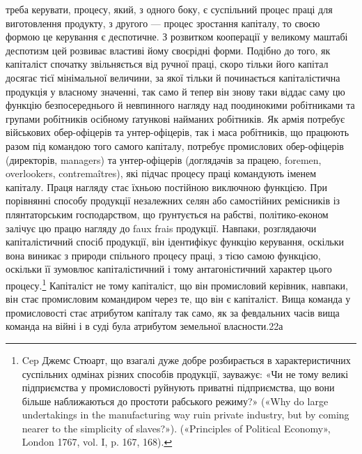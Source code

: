 \parcont{}  %
треба керувати, процесу, який, з одного боку, є суспільний процес
праці для виготовлення продукту, з другого — процес зростання
капіталу, то своєю формою це керування є деспотичне. З розвитком
кооперації у великому маштабі деспотизм цей розвиває властиві
йому своєрідні форми. Подібно до того, як капіталіст спочатку
звільняється від ручної праці, скоро тільки його капітал
досягає тієї мінімальної величини, за якої тільки й починається
капіталістична продукція у власному значенні, так само й тепер
він знову таки віддає саму цю функцію безпосереднього й невпинного
нагляду над поодинокими робітниками та групами робітників
осібному ґатункові найманих робітників. Як армія потребує
військових обер-офіцерів та унтер-офіцерів, так і маса робітників,
що працюють разом під командою того самого капіталу,
потребує промислових обер-офіцерів (директорів, managers)
та унтер-офіцерів (доглядачів за працею, foremen, overlookers,
contremaîtres), які підчас процесу праці командують іменем
капіталу. Праця нагляду стає їхньою постійною виключною
функцією. При порівнянні способу продукції незалежних селян
або самостійних ремісників із плянтаторським господарством,
що ґрунтується на рабстві, політико-економ залічує цю працю
нагляду до faux frais продукції. Навпаки, розглядаючи капіталістичний
спосіб продукції, він ідентифікує функцію керування,
оскільки вона виникає з природи спільного процесу праці, з
тією самою функцією, оскільки її зумовлює капіталістичний і
тому антагоністичний характер цього процесу.\footnote{
Cep Джемс Стюарт, що взагалі дуже добре розбирається в характеристичних
суспільних одмінах різних способів продукції, зауважує:
«Чи не тому великі підприємства у промисловості руйнують приватні
підприємства, що вони більше наближаються до простоти рабського режиму?»
(«Why do large undertakings in the manufacturing way ruin private
industry, but by coming nearer to the simplicity of slaves?»). («Principles
of Political Economy», London 1767, vol. I, p. 167, 168).
} Капіталіст не
тому капіталіст, що він промисловий керівник, навпаки, він стає
промисловим командиром через те, що він є капіталіст. Вища
команда у промисловості стає атрибутом капіталу так само, як
за февдальних часів вища команда на війні і в суді була атрибутом
земельної власности.22а

